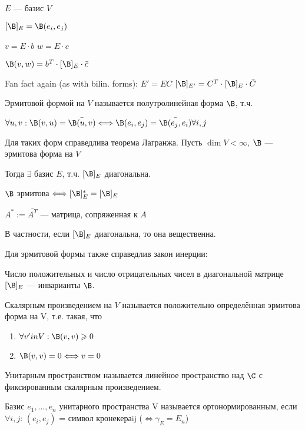 \begin{conj}
    $E$ --- базис $V$

    $[\B]_E = \B(e_i, e_j)$

    $v = E \cdot b$
    $w = E \cdot c$

    $\B(v, w) = b^T \cdot [\B]_E \cdot \bar{c}$
\end{conj}

Fan fact again (as with bilin. forms):
    $E' = EC$
    $[\B]_{E'} = C^T \cdot [\B]_{E} \cdot \bar{C}$

\begin{conj}
    Эрмитовой формой на $V$ называется полутролинейная форма $\B$, т.ч.
    
    $\forall u, v: \B(v, u) = \bar{\B(u, v)} \Longleftrightarrow \B(e_i, e_j) = \bar{\B(e_j, e_i)} \forall i, j$
 
\end{conj}

Для таких форм справедлива теорема Лагранжа.
Пусть $\dim V < \infty$, $\B$ ---  эрмитова форма на $V$

Тогда $\exists$ базис $E$, т.ч. $[\B]_E$ диагональна.

\notice $\B$ эрмитова $\Longleftrightarrow [\B]^*_E  = [\B]_E$
    
$A^* := \bar{A^T}$ --- матрица, сопряженная к $A$

В частности, если $[\B]_E$ диагональна, то она вещественна.

Для эрмитовой формы также справедлив закон инерции:

Число положительных и число отрицательных чисел в диагональной матрице $[\B]_E$ --- инварианты $\B$.

\begin{conj}
    Скалярным произведением на $V$ называется положительно определённая эрмитова форма на V, т.е. такая, что
    \begin{enumerate}
        \item $\forall v 'in V: \B(v, v) \geqslant 0$
        \item $\B(v, v) = 0 \Longleftrightarrow v = 0$
    \end{enumerate}
\end{conj}

\begin{conj}
    Унитарным пространством называется линейное пространство над $\C$ с фиксированным скалярным произведением.
\end{conj}

\begin{theorem}
    Базис $e_1, \dots, e_n$ унитарного пространства V называется ортонормированным,
    если $\forall i, j: \, (e_i, e_j)$ = символ кронекера{ij} ($\Longleftrightarrow \gamma_E = E_n$)
\end{theorem}

